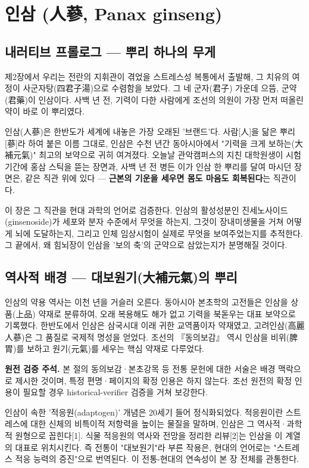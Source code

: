 \documentclass[11pt,oneside]{book}
\newenvironment{authnote}
  {\par\smallskip\begingroup\leftskip=7mm\rightskip=5mm\small\color{muted}\noindent\ignorespaces}
  {\par\endgroup\smallskip}
\begin{document}

\chapter{인삼 (人蔘, Panax ginseng)}

\section{내러티브 프롤로그 — 뿌리 하나의 무게}
제2장에서 우리는 전란의 지휘관이 겪었을 스트레스성 복통에서 출발해, 그 치유의 여정이 사군자탕(四君子湯)으로 수렴함을 보았다. 그 네 군자(君子) 가운데 으뜸, 군약(君藥)이 인삼이다. 사백 년 전, 기력이 다한 사람에게 조선의 의원이 가장 먼저 떠올린 약이 바로 이 뿌리였다.

인삼(人蔘)은 한반도가 세계에 내놓은 가장 오래된 '브랜드'다. 사람[人]을 닮은 뿌리[蔘]라 하여 붙은 이름 그대로, 인삼은 수천 년간 동아시아에서 "기력을 크게 보하는(大補元氣)" 최고의 보약으로 귀히 여겨졌다. 오늘날 관악캠퍼스의 지친 대학원생이 시험 기간에 홍삼 스틱을 뜯는 장면과, 사백 년 전 병든 이가 인삼 한 뿌리를 달여 마시던 장면은, 같은 직관 위에 있다 — \textbf{근본의 기운을 세우면 몸도 마음도 회복된다}는 직관이다.

이 장은 그 직관을 현대 과학의 언어로 검증한다. 인삼의 활성성분인 진세노사이드(ginsenoside)가 세포와 분자 수준에서 무엇을 하는지, 그것이 장내미생물을 거쳐 어떻게 뇌에 도달하는지, 그리고 인체 임상시험이 실제로 무엇을 보여주었는지를 추적한다. 그 끝에서, 왜 힘뇌장이 인삼을 '보의 축'의 군약으로 삼았는지가 분명해질 것이다.

\section{역사적 배경 — 대보원기(大補元氣)의 뿌리}
인삼의 약용 역사는 이천 년을 거슬러 오른다. 동아시아 본초학의 고전들은 인삼을 상품(上品) 약재로 분류하여, 오래 복용해도 해가 없고 기력을 북돋우는 대표 보약으로 기록했다. 한반도에서 인삼은 삼국시대 이래 귀한 교역품이자 약재였고, 고려인삼(高麗人蔘)은 그 품질로 국제적 명성을 얻었다. 조선의 『동의보감』 역시 인삼을 비위(脾胃)를 보하고 원기(元氣)를 세우는 핵심 약재로 다루었다.

\begin{authnote}\textbf{원전 검증 주석.} 본 절의 동의보감·본초강목 등 전통 문헌에 대한 서술은 배경 맥락으로 제시한 것이며, 특정 편명·페이지의 확정 인용은 하지 않는다. 조선 원전의 확정 인용이 필요할 경우 historical-verifier 검증을 거쳐 보강한다.\end{authnote}
인삼이 속한 '적응원(adaptogen)' 개념은 20세기 들어 정식화되었다. 적응원이란 스트레스에 대한 신체의 비특이적 저항력을 높이는 물질을 말하며, 인삼은 그 역사적·과학적 원형으로 꼽힌다[1]. 식물 적응원의 역사와 전망을 정리한 리뷰[2]는 인삼을 이 계열의 대표로 위치시킨다. 즉 전통이 "대보원기"라 부른 작용은, 현대의 언어로는 "스트레스 적응 능력의 증진"으로 번역된다. 이 전통-현대의 연속성이 본 장 전체를 관통한다.
\end{document}
